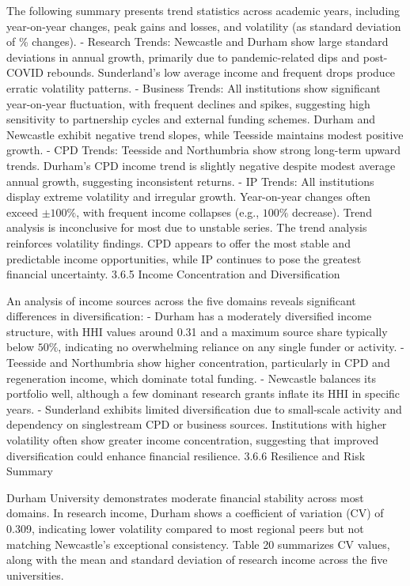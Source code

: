 The following summary presents trend statistics across academic years, including year-on-year changes, peak gains and losses, and volatility (as standard deviation of \% changes).
- Research Trends: Newcastle and Durham show large standard deviations in annual growth, primarily due to pandemic-related dips and post-COVID rebounds. Sunderland's low average income and frequent drops produce erratic volatility patterns.
- Business Trends: All institutions show significant year-on-year fluctuation, with frequent declines and spikes, suggesting high sensitivity to partnership cycles and external funding schemes. Durham and Newcastle exhibit negative trend slopes, while Teesside maintains modest positive growth.
- CPD Trends: Teesside and Northumbria show strong long-term upward trends. Durham's CPD income trend is slightly negative despite modest average annual growth, suggesting inconsistent returns.
- IP Trends: All institutions display extreme volatility and irregular growth. Year-on-year changes often exceed $\pm 100 \%$, with frequent income collapses (e.g., $100 \%$ decrease). Trend analysis is inconclusive for most due to unstable series.
The trend analysis reinforces volatility findings. CPD appears to offer the most stable and predictable income opportunities, while IP continues to pose the greatest financial uncertainty.
3.6.5 Income Concentration and Diversification

An analysis of income sources across the five domains reveals significant differences in diversification:
- Durham has a moderately diversified income structure, with HHI values around 0.31 and a maximum source share typically below $50 \%$, indicating no overwhelming reliance on any single funder or activity.
- Teesside and Northumbria show higher concentration, particularly in CPD and regeneration income, which dominate total funding.
- Newcastle balances its portfolio well, although a few dominant research grants inflate its HHI in specific years.
- Sunderland exhibits limited diversification due to small-scale activity and dependency on singlestream CPD or business sources.
Institutions with higher volatility often show greater income concentration, suggesting that improved diversification could enhance financial resilience.
3.6.6 Resilience and Risk Summary

Durham University demonstrates moderate financial stability across most domains. In research income, Durham shows a coefficient of variation (CV) of 0.309, indicating lower volatility compared to most regional peers but not matching Newcastle's exceptional consistency. Table 20 summarizes CV values, along with the mean and standard deviation of research income across the five universities.

